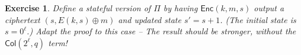 \documentclass[11pt]{article}
\newtheorem{exercise}{Exercise}
\newcommand{\Enc}{\mathsf{Enc}}
\newcommand{\Col}{\mathsf{Col}}
\begin{document}
\begin{exercise}
    Define a stateful version of $\Pi$ by having $\Enc(k,m,s)$ output
    a ciphertext $(s,E(k,s)\oplus m)$ and updated state $s' = s+1$.
    (The initial state is $s=0^\ell$.) Adapt the proof to this case -- The
    result should be stronger, without the $\Col(2^\ell,q)$ term!
\end{exercise}
\end{document}
